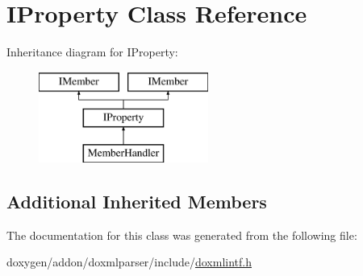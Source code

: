 \hypertarget{class_i_property}{}\section{I\+Property Class Reference}
\label{class_i_property}
Inheritance diagram for I\+Property\+:\begin{figure}[H]
\begin{center}
\leavevmode
\includegraphics[height=3.000000cm]{class_i_property}
\end{center}
\end{figure}
\subsection*{Additional Inherited Members}


The documentation for this class was generated from the following file\+:\begin{DoxyCompactItemize}
\item 
doxygen/addon/doxmlparser/include/\mbox{\hyperlink{include_2doxmlintf_8h}{doxmlintf.\+h}}\end{DoxyCompactItemize}
